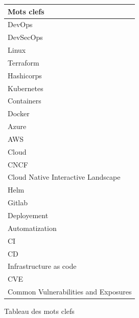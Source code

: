 \documentclass[11pt,a4paper,oneside]{book}
\begin{document}
\begin{figure}[h]
\begin{tabularx}{14cm}{|X|}
\hline
\rowcolor{gray!30} Mots clefs \\
\hline
DevOps \\
DevSecOps \\
Linux \\
Terraform \\
Hashicorps \\
Kubernetes \\
Containers \\
Docker \\
Azure \\
AWS \\
Cloud \\
CNCF \\
Cloud Native Interactive Landscape \\
Helm \\
Gitlab \\
Deployement \\
Automatization \\
CI \\
CD \\
Infrastructure as code \\
CVE \\
Common Vulnerabilities and Exposures \\
\hline
\end{tabularx}
\caption{Tableau des mots clefs}
\end{figure}


\newpage
\end{document}
